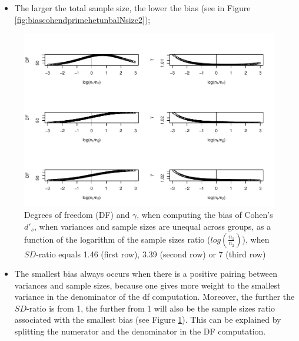 \documentclass[
  man]{apa6}
\providecommand{\tightlist}{%
  \setlength{\itemsep}{0pt}\setlength{\parskip}{0pt}}
\begin{document}
\begin{itemize}
\tightlist
\item
  The larger the total sample size, the lower the bias (see in Figure \ref{fig:biascohendprimehetunbalNsize2});
\end{itemize}

\begin{figure}
\centering
\includegraphics{Theoretical-Bias-of-all-estimators-as-a-function-of-population-parameters_files/figure-latex/biascohendprimehetunbaldfandbias-1.pdf}
\caption{\label{fig:biascohendprimehetunbaldfandbias}Degrees of freedom (DF) and \(\gamma\), when computing the bias of Cohen's \(d'_s\), when variances and sample sizes are unequal across groups, as a function of the logarithm of the sample sizes ratio (\(log \left( \frac{n_1}{n_2} \right)\)), when \(SD\)-ratio equals 1.46 (first row), 3.39 (second row) or 7 (third row)}
\end{figure}

\begin{itemize}
\tightlist
\item
  The smallest bias always occurs when there is a positive pairing between variances and sample sizes, because one gives more weight to the smallest variance in the denominator of the df computation. Moreover, the further the \(SD\)-ratio is from 1, the further from 1 will also be the sample sizes ratio associated with the smallest bias (see Figure \ref{fig:biascohendprimehetunbaldfandbias}). This can be explained by splitting the numerator and the denominator in the DF computation.
\end{itemize}
\end{document}
